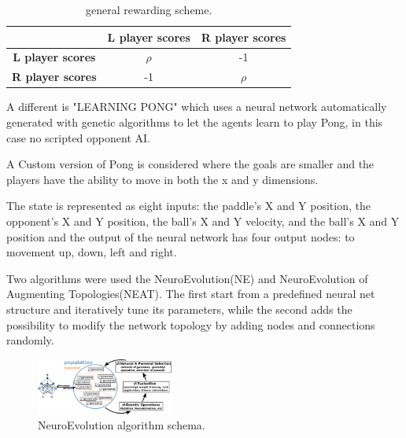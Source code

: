 \begin{table}[ht]
  \renewcommand{\arraystretch}{1.3}
  \caption{general rewarding scheme.}
  \label{tab:reward-scheme-2}
  \centering
  \begin{tabular}{c|c|c|}
    \cline{2-3}
                                                   & \textbf{L player scores} & \textbf{R player scores} \\ \hline
    \multicolumn{1}{|c|}{\textbf{L player scores}} & $\rho$                   & -1                       \\ \hline
    \multicolumn{1}{|c|}{\textbf{R player scores}} & -1                       & $\rho$                   \\ \hline
  \end{tabular}
\end{table}

\noindent
A different is "LEARNING PONG" which uses a neural network automatically generated with genetic algorithms to let the agents learn to play Pong, in this case no scripted opponent AI.

A Custom version of Pong is considered where the goals are smaller and the players have the ability to move in both the x and y dimensions.

The state is represented as eight inputs: the paddle's X and Y position, the opponent's X and Y position, the ball's X and Y velocity,
and the ball's X and Y position and the output of the neural network has four output nodes: to movement up, down, left and right.

Two algorithms were used the NeuroEvolution(NE) and NeuroEvolution of Augmenting Topologies(NEAT).
The first start from a predefined neural net structure and iteratively tune its parameters, while the second adds the possibility to modify the network topology by adding nodes and connections randomly.



\begin{figure}[ht]
  \centering
  \includegraphics[width=0.4\textwidth]{images/neuroevolution.png}
  \caption{NeuroEvolution algorithm schema.}
  \label{fig:ne}
\end{figure}
